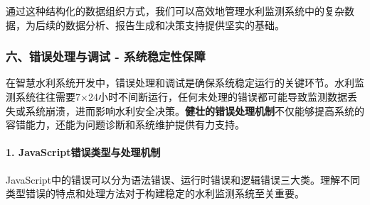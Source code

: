 通过这种结构化的数据组织方式，我们可以高效地管理水利监测系统中的复杂数据，为后续的数据分析、报告生成和决策支持提供坚实的基础。

\subsubsection{六、错误处理与调试 - 系统稳定性保障}\label{ux516dux9519ux8befux5904ux7406ux4e0eux8c03ux8bd5---ux7cfbux7edfux7a33ux5b9aux6027ux4fddux969c}

在智慧水利系统开发中，错误处理和调试是确保系统稳定运行的关键环节。水利监测系统往往需要7×24小时不间断运行，任何未处理的错误都可能导致监测数据丢失或系统崩溃，进而影响水利安全决策。\textbf{健壮的错误处理机制}不仅能够提高系统的容错能力，还能为问题诊断和系统维护提供有力支持。

\paragraph{1. JavaScript错误类型与处理机制}\label{javascriptux9519ux8befux7c7bux578bux4e0eux5904ux7406ux673aux5236}

JavaScript中的错误可以分为语法错误、运行时错误和逻辑错误三大类。理解不同类型错误的特点和处理方法对于构建稳定的水利监测系统至关重要。

